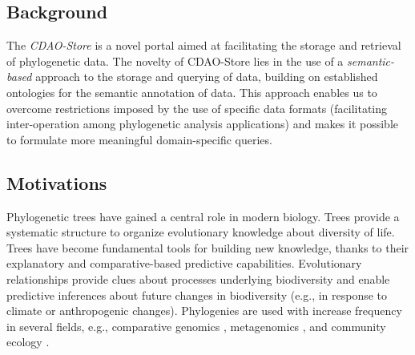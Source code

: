 \documentclass[10pt]{bmc_article}
\newenvironment{bmcformat}{\begin{raggedright}\baselineskip20pt\sloppy\setboolean{publ}{false}}{\end{raggedright}\baselineskip20pt\sloppy}
\begin{document}
\begin{bmcformat}








\section*{Background}

The \emph{CDAO-Store} is a novel portal aimed at facilitating the storage 
and retrieval of phylogenetic data. The novelty of CDAO-Store lies in the use of a 
\emph{semantic-based}
approach to the storage and querying of data, building on established ontologies for the
semantic annotation of data. This approach enables us to overcome restrictions imposed
by the use of specific data formats (facilitating inter-operation among phylogenetic analysis
applications) and makes it possible to formulate more meaningful domain-specific queries.


\subsection*{Motivations}

Phylogenetic trees have gained a central role in modern biology. Trees provide  a
systematic structure to organize evolutionary knowledge about diversity of life. Trees
have become fundamental tools for building new knowledge, thanks to their explanatory
and comparative-based predictive capabilities. Evolutionary relationships provide 
clues about processes underlying biodiversity and enable predictive inferences about
future changes in biodiversity (e.g., in response to climate or anthropogenic changes).
Phylogenies are used with increase frequency in several fields, e.g., comparative
genomics \cite{Ell08}, metagenomics \cite{WE08}, and community ecology \cite{WAMD02}.


\end{bmcformat}
\end{document}
